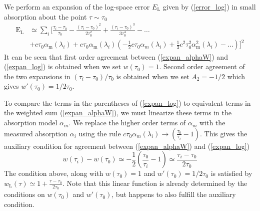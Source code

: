 We perform an expansion of the log-space error $E_\mathrm{L}$ given by (\ref{error_log}) in small absorption about the point $\tau \sim \tau_0$
\begin{align} \label{expan_log}
	\mathrm{E}_\mathrm{L} &\simeq
	\sum_i \Bigg[
	\frac{\tau_i - \tau_0}{\tau_0} - \frac{\left(\tau_i-\tau_0\right)^2}{2\tau_0^2} +
	\frac{\left(\tau_i - \tau_0\right)^3}{3\tau_0^4} - \ldots \nonumber \\
	&+ c\tau_0\alpha_\mathrm{m}(\lambda_i) %
	+ c\tau_0 \alpha_\mathrm{m}(\lambda_i)\left(-\frac{1}{2}c\tau_0\alpha_m(\lambda_i) + \frac{1}{3}c^2\tau_0^2\alpha^2_\mathrm{m}(\lambda_i) - \ldots\right)
	\Bigg]^2
\end{align}
It can be seen that first order agreement between (\ref{expan_alphaW}) and (\ref{expan_log}) is obtained when we set $w(\tau_0) = 1$. Second order agreement of the two expansions in $(\tau_i-\tau_0)/\tau_0$ is obtained when we set $A_2=-1/2$ which gives $w'(\tau_0) = 1/2\tau_0$.

To compare the terms in the parentheses of (\ref{expan_log}) to equivalent terms in the weighted sum (\ref{expan_alphaW}), we must linearize these terms in the absorption model $\alpha_m$. We replace the higher order terms of $\alpha_m$ with the measured absorption $\alpha_i$ using the rule $c\tau_0\alpha_m(\lambda_i)\rightarrow \left(\frac{\tau_0}{\tau_i}-1\right)$. This gives the auxiliary condition for agreement between (\ref{expan_alphaW}) and (\ref{expan_log})
\begin{equation} \label{check_1st_order_log}
	w(\tau_i) - w(\tau_0) \simeq -\frac{1}{2}\left(\frac{\tau_0}{\tau_i}-1\right) \simeq \frac{\tau_i-\tau_0}{2\tau_0}
\end{equation}
The condition above, along with $w(\tau_0)=1$ and $w'(\tau_0)=1/2\tau_0$ is satisfied by $w_\mathrm{L}(\tau) \simeq 1 + \frac{\tau-\tau_0}{2\tau_0}$. Note that this linear function is already determined by the conditions on $w(\tau_0)$ and $w'(\tau_0)$, but happens to also fulfill the auxiliary condition.

